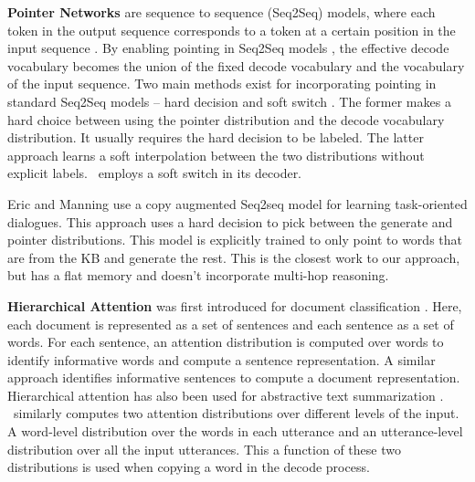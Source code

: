 \vspace{0.5ex}
\noindent\textbf{Pointer Networks}  are sequence to sequence (Seq2Seq) models, where each token in the output sequence corresponds to a token at a certain position in the input sequence \cite{vinyals2015pointer}. By enabling pointing in Seq2Seq models \cite{cho2014learning,sutskever2014sequence}, the effective decode vocabulary becomes the union of the fixed decode vocabulary and the vocabulary of the input sequence. Two main methods \cite{gu2016incorporating,eric2017copy} exist for incorporating pointing in standard Seq2Seq models -- hard decision \cite{nallapati2016abstractive,gu2016incorporating,eric2017copy} and soft switch \cite{see2017get}. The former makes a hard choice between using the pointer distribution and the decode vocabulary distribution. It usually requires the hard decision to be labeled. The latter approach learns a soft interpolation between the two distributions without explicit labels. \sys\ employs a soft switch in its decoder.


Eric and Manning
\cite{eric2017copy} use a copy augmented Seq2seq model for learning task-oriented dialogues. This approach uses a hard decision to pick between the generate and pointer distributions. This model is explicitly trained to only point to words that are from the KB and generate the rest. This is the closest work to our approach, but has a flat memory and doesn't incorporate multi-hop reasoning.

\vspace{0.5ex}
\noindent\textbf{Hierarchical Attention} was first introduced for document classification \cite{yang2016hierarchical}. Here, each document is represented as a set of sentences and each sentence as a set of words. For each sentence, an attention distribution is computed over words to identify informative words and compute a sentence representation. A similar approach identifies informative sentences to compute a document representation. Hierarchical attention has also been used for abstractive text summarization \cite{nallapati2016abstractive}.
\sys\ similarly computes two attention distributions over different levels of the input. A word-level distribution over the words in each utterance and an utterance-level distribution over all the input utterances. This a function of these two distributions is used when copying a word in the decode process.

